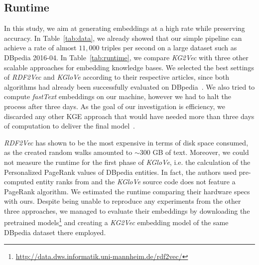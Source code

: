 \documentclass[graybox]{archivesofdatascience}
\newcommand{\ktvplain}{KG2Vec\xspace}
\newcommand{\ktv}{\textit{\ktvplain}\xspace}
\newcommand{\rtv}{\textit{RDF2Vec}\xspace}
\newcommand{\kgl}{\textit{KGloVe}\xspace}
\begin{document}
\subsection{Runtime}



In this study, we aim at generating embeddings at a high rate while preserving accuracy.
In Table~\ref{tab:data}, we already showed that our simple pipeline can achieve a rate of almost $11,000$ triples per second on a large dataset such as DBpedia 2016-04.
In Table~\ref{tab:runtime}, we compare \ktv with three other scalable approaches for embedding knowledge bases.
We selected the best settings of \rtv and \kgl according to their respective articles, since both algorithms had already been successfully evaluated on DBpedia~\citep{ristoski2016rdf2vec,cochez2017global}.
We also tried to compute \textit{fastText} embeddings on our machine, however we had to halt the process after three days.
As the goal of our investigation is efficiency, we discarded any other KGE approach that would have needed more than three days of computation to deliver the final model~\citep{cochez2017global}.

\rtv has shown to be the most expensive in terms of disk space consumed, as the created random walks amounted to $\sim$300 GB of text.
Moreover, we could not measure the runtime for the first phase of \kgl, i.e. the calculation of the Personalized PageRank values of DBpedia entities.
In fact, the authors used pre-computed entity ranks from \cite{Thalhammer2016} and the \kgl source code does not feature a PageRank algorithm.
We estimated the runtime comparing their hardware specs with ours.
Despite being unable to reproduce any experiments from the other three approaches, we managed to evaluate their embeddings by downloading the pretrained models\footnote{\url{http://data.dws.informatik.uni-mannheim.de/rdf2vec/}} and creating a \ktv embedding model of the same DBpedia dataset there employed.
\end{document}
